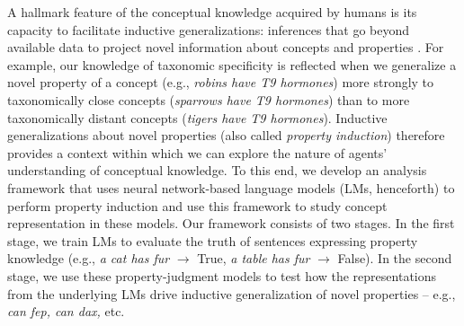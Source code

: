\documentclass[10pt,letterpaper]{article}
\begin{document}
A hallmark feature of the conceptual knowledge acquired by humans is its capacity to facilitate inductive generalizations: inferences that go beyond available data to project novel information about concepts and properties \citep{osherson1990category, chater2011inductive, hayes2018inductive}.
For example, our knowledge of taxonomic specificity is reflected when we generalize a novel property of a concept (e.g., \textit{robins have T9 hormones}) more strongly to taxonomically close concepts (\textit{sparrows have T9 hormones}) than to more taxonomically distant concepts (\textit{tigers have T9 hormones}).
Inductive generalizations about novel properties (also called \textit{property induction}) therefore provides a context within which we can explore the nature of 
agents' understanding of conceptual knowledge.
To this end, we develop an analysis framework that uses neural network-based language models (LMs, henceforth) to perform property induction and use this framework to study concept representation in these models.
Our framework consists of two stages. 
In the first stage, we train LMs to evaluate the truth of sentences expressing property knowledge (e.g., \textit{a cat has fur} $\rightarrow$ True, \textit{a table has fur} $\rightarrow$ False). 
In the second stage, we use these property-judgment models to test how the representations from the underlying LMs drive inductive generalization of novel properties -- e.g., \textit{can fep, can dax,} etc.
\end{document}
